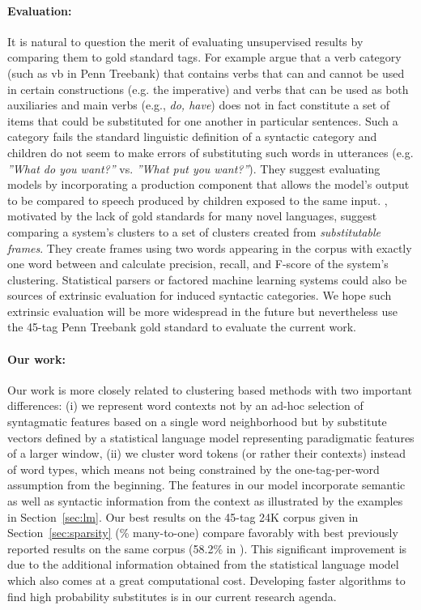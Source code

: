 \paragraph{Evaluation:}
It is natural to question the merit of evaluating unsupervised results
by comparing them to gold standard tags.  For example
\cite{freudenthal2005resolution} argue that a verb category (such as
{\sc vb} in Penn Treebank) that contains verbs that can and cannot be
used in certain constructions (e.g. the imperative) and verbs that can
be used as both auxiliaries and main verbs (e.g., {\em do, have}) does
not in fact constitute a set of items that could be substituted for
one another in particular sentences.  Such a category fails the
standard linguistic definition of a syntactic category and children do
not seem to make errors of substituting such words in utterances
(e.g. {\em''What do you want?''} vs. {\em *''What put you want?''}).
They suggest evaluating models by incorporating a production component
that allows the model's output to be compared to speech produced by
children exposed to the same input.  \cite{frank2009evaluating},
motivated by the lack of gold standards for many novel languages,
suggest comparing a system's clusters to a set of clusters created
from {\em substitutable frames}.  They create frames using two words
appearing in the corpus with exactly one word between and calculate
precision, recall, and F-score of the system's clustering.
Statistical parsers or factored machine learning systems could also be
sources of extrinsic evaluation for induced syntactic categories.  We
hope such extrinsic evaluation will be more widespread in the future
but nevertheless use the 45-tag Penn Treebank gold standard to
evaluate the current work.

\paragraph{Our work:}
Our work is more closely related to clustering based methods with two
important differences: (i) we represent word contexts not by an ad-hoc
selection of syntagmatic features based on a single word neighborhood
but by substitute vectors defined by a statistical language model
representing paradigmatic features of a larger window, (ii) we cluster
word tokens (or rather their contexts) instead of word types, which
means not being constrained by the one-tag-per-word assumption from
the beginning.  The features in our model incorporate semantic as well
as syntactic information from the context as illustrated by the
examples in Section~\ref{sec:lm}.  Our best results on the 45-tag 24K
corpus given in Section~\ref{sec:sparsity} (\collapseResult\% many-to-one)
compare favorably with best previously reported results on the same
corpus (58.2\% in \cite{Gao:2008:CBE:1613715.1613761}).  This
significant improvement is due to the additional information obtained
from the statistical language model which also comes at a great
computational cost.  Developing faster algorithms to find high
probability substitutes is in our current research agenda.

